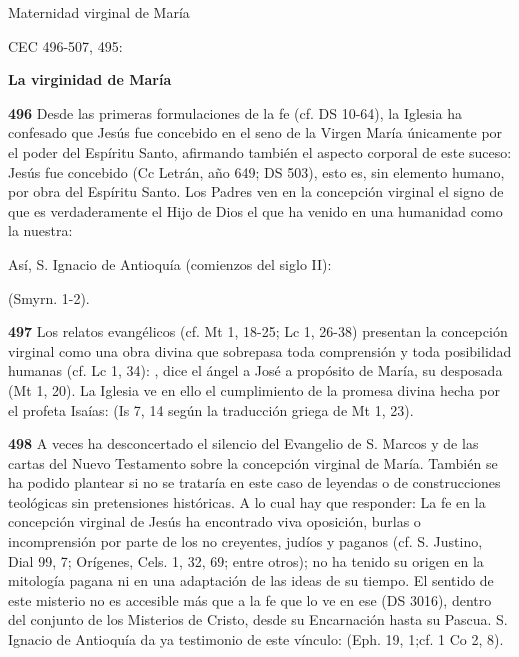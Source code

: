 Maternidad virginal de María

CEC 496-507, 495:

\textbf{La virginidad de María}

\textbf{496} Desde las primeras formulaciones de la fe (cf. DS 10-64), la Iglesia ha confesado que Jesús fue concebido en el seno de la Virgen María únicamente por el poder del Espíritu Santo, afirmando también el aspecto corporal de este suceso: Jesús fue concebido  (Cc Letrán, año 649; DS 503), esto es, sin elemento humano, por obra del Espíritu Santo. Los Padres ven en la concepción virginal el signo de que es verdaderamente el Hijo de Dios el que ha venido en una humanidad como la nuestra:

Así, S. Ignacio de Antioquía (comienzos del siglo II):

 (Smyrn. 1-2).

\textbf{497} Los relatos evangélicos (cf. Mt 1, 18-25; Lc 1, 26-38) presentan la concepción virginal como una obra divina que sobrepasa toda comprensión y toda posibilidad humanas (cf. Lc 1, 34): , dice el ángel a José a propósito de María, su desposada (Mt 1, 20). La Iglesia ve en ello el cumplimiento de la promesa divina hecha por el profeta Isaías:  (Is 7, 14 según la traducción griega de Mt 1, 23).

\textbf{498} A veces ha desconcertado el silencio del Evangelio de S. Marcos y de las cartas del Nuevo Testamento sobre la concepción virginal de María. También se ha podido plantear si no se trataría en este caso de leyendas o de construcciones teológicas sin pretensiones históricas. A lo cual hay que responder: La fe en la concepción virginal de Jesús ha encontrado viva oposición, burlas o incomprensión por parte de los no creyentes, judíos y paganos (cf. S. Justino, Dial 99, 7; Orígenes, Cels. 1, 32, 69; entre otros); no ha tenido su origen en la mitología pagana ni en una adaptación de las ideas de su tiempo. El sentido de este misterio no es accesible más que a la fe que lo ve en ese  (DS 3016), dentro del conjunto de los Misterios de Cristo, desde su Encarnación hasta su Pascua. S. Ignacio de Antioquía da ya testimonio de este vínculo:  (Eph. 19, 1;cf. 1 Co 2, 8).\textbf{\\ }

